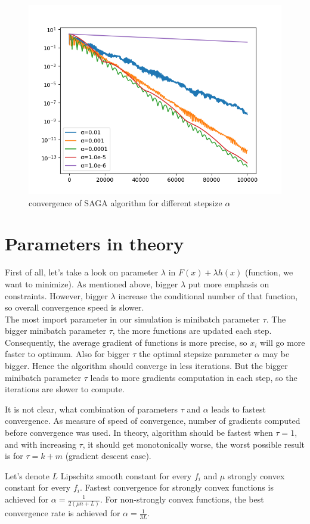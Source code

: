 \documentclass[11pt]{book}
\begin{document}
\begin{figure}[H]
	\centering
	\includegraphics[width=0.7\linewidth]{saga_convergence.png}
	\caption{convergence of SAGA algorithm for different stepsize $\alpha$}
	\label{fig:saga}
\end{figure}

\section{Parameters in theory}

First of all, let's take a look on parameter $\lambda$ in $F(x)+\lambda h(x)$ (function, we want to minimize). As mentioned above, bigger $\lambda$ put more emphasis on constraints. However, bigger $\lambda$ increase the conditional number of that function, so overall convergence speed is slower.\\

The most import parameter in our simulation is minibatch parameter $\tau$. The bigger minibatch parameter $\tau$, the more functions are updated each step. Consequently, the average gradient of functions is more precise, so $x_i$ will go more faster to optimum. Also for bigger $\tau$ the optimal stepsize parameter $\alpha$ may be bigger. Hence the algorithm should converge in less iterations. But the bigger minibatch parameter $\tau$ leads to more gradients computation in each step, so the iterations are slower to compute.

It is not clear, what combination of parameters $\tau$ and $\alpha$ leads to fastest convergence. As measure of speed of convergence, number of gradients computed before convergence was used. In theory, algorithm should be fastest when $\tau=1$, and with increasing $\tau$, it should get monotonically worse, the worst possible result is for $\tau = k+m$ (gradient descent case).

Let's denote $L$ Lipschitz smooth constant for every $f_i$ and $\mu$ strongly convex constant for every $f_i$. Fastest convergence for strongly convex functions is achieved for $\alpha = \frac{1}{2(\mu n + L)}$. For non-strongly convex functions, the best convergence rate is achieved for $\alpha = \frac{1}{3L}$.\\
\end{document}
